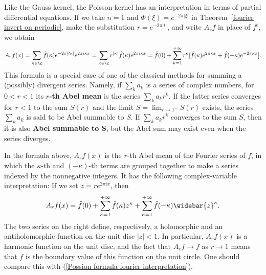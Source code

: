 \begin{example}
Like the Gauss kernel, the Poisson kernel has an interpretation in terms of partial differential equations. If we take $n=1$ and $\Phi(\xi)=e^{-2\pi|\xi|}$ in Theorem~\ref{fourier invert on periodic}, make the substitution $r=e^{-2\pi|t|}$, and write $A_rf$ in place of $f^t$, we obtain
\[A_rf(x)=\sum_{\kappa\in\Z}\hat{f}(\kappa)e^{-2\pi|t\kappa|}e^{2\pi i\kappa x}=\sum_{\kappa\in\Z}r^{|\kappa|}\hat{f}(\kappa)e^{2\pi i\kappa x}=\hat{f}(0)+\sum_{\kappa=1}^{+\infty}r^\kappa[\hat{f}(\kappa)e^{2\pi\kappa x}+\hat{f}(-\kappa)e^{-2\pi\kappa x}].\]
This formula is a special case of one of the classical methods for summing a (possibly) divergent series. Namely, if $\sum_ka_k$ is a series of complex numbers, for $0<r<1$ its \textbf{$r$-th Abel mean} is the series $\sum_ka_kr^k$. If the latter series converges for $r<1$ to the sum $S(r)$ and the limit $S=\lim_{r\to 1^-}S(r)$ exists, the series $\sum_ka_k$ is said to be Abel summable to $S$. If $\sum_ka_kr^k$ converges to the sum $S$, then it is also \textbf{Abel summable to $\bm{S}$}, but the Abel sum may exist even when the series diverges.\par
In the formula above, $A_rf(x)$ is the $r$-th Abel mean of the Fourier series of $f$, in which the $\kappa$-th and $(-\kappa)$-th terms are grouped together to make a series indexed by the nonnegative integers. It has the following complex-variable interpretation: If we set $z=re^{2\pi ix}$, then
\[A_rf(x)=\hat{f}(0)+\sum_{\kappa=1}^{+\infty}\hat{f}(\kappa)z^{\kappa}+\sum_{\kappa=1}^{+\infty}\hat{f}(-\kappa)\widebar{z}^{\kappa}.\]
The two series on the right define, respectively, a holomorphic and an antiholomorphic function on the unit disc $|z|<1$. In particular, $A_rf(x)$ is a harmonic function on the unit disc, and the fact that $A_rf\to f$ as $r\to 1$ means that $f$ is the boundary value of this function on the unit circle. One should compare this with (\ref{Possion formula fourier interpretation}).
\end{example}
